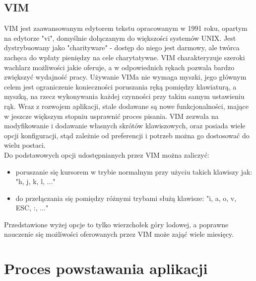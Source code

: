 \documentclass[12pt, a4paper]{article}
\begin{document}
\begin{sloppypar}
{  \subsection{VIM}
  {
    VIM jest zaawansowanym edytorem tekstu opracowanym w 1991 roku, opartym na edytorze
    "vi", domyślnie dołączanym do większości systemów UNIX. Jest dystrybuowany jako
    "charityware" - dostęp do niego jest darmowy, ale twórca zachęca do wpłaty pieniędzy
    na cele charytatywne. VIM charakteryzuje szeroki wachlarz możliwości jakie oferuje,
    a w odpowiednich rękach pozwala bardzo zwiększyć wydajność pracy. Używanie VIMa
    nie wymaga myszki, jego głównym celem jest ograniczenie konieczności poruszania ręką
    pomiędzy klawiaturą, a myszką, na rzecz wykonywania każdej czynności przy takim samym
    ustawieniu rąk. Wraz z rozwojem aplikacji, stale dodawane są nowe funkcjonalności,
    mające w jeszcze większym stopniu usprawnić proces pisania. VIM zezwala na
    modyfikowanie i dodawanie własnych skrótów klawiszowych, oraz posiada wiele opcji
    konfiguracji, stąd zależnie od preferencji i potrzeb można go dostosować do wielu
    postaci.\\
    Do podstawowych opcji udostępnianych przez VIM można zaliczyć:
    \begin{itemize}
      \item poruszanie się kursorem w trybie normalnym przy użyciu takich klawiszy jak:\\
      "h, j, k, l, ..."
      \item do przełączania się pomiędzy różnymi trybami służą klawisze:
      "i, a, o, v, ESC, :, ..."
    \end{itemize}
    Przedstawione wyżej opcje to tylko wierzchołek góry lodowej, a poprawne nauczenie
    się możliwości oferowanych przez VIM może zająć wiele miesięcy.
  }
}

\section{Proces powstawania aplikacji}
{
}
\end{sloppypar}
\end{document}
